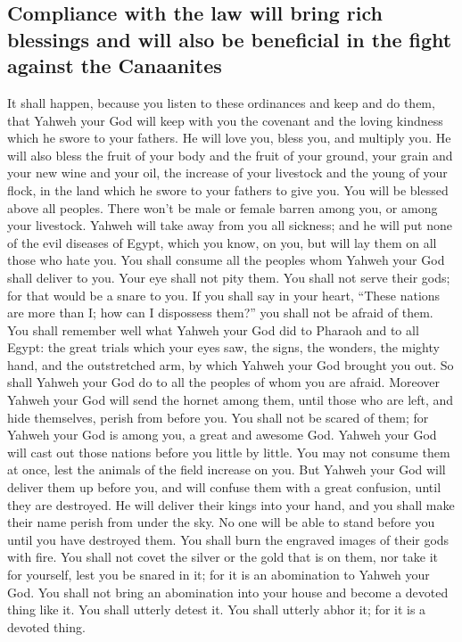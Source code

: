 \hypertarget{compliance-with-the-law-will-bring-rich-blessings-and-will-also-be-beneficial-in-the-fight-against-the-canaanites}{%
\subsection{Compliance with the law will bring rich blessings and will
also be beneficial in the fight against the
Canaanites}\label{compliance-with-the-law-will-bring-rich-blessings-and-will-also-be-beneficial-in-the-fight-against-the-canaanites}}

 It shall happen, because you listen to these ordinances
and keep and do them, that Yahweh your God will keep with you the
covenant and the loving kindness which he swore to your fathers.
 He will love you, bless you, and multiply you. He will
also bless the fruit of your body and the fruit of your ground, your
grain and your new wine and your oil, the increase of your livestock and
the young of your flock, in the land which he swore to your fathers to
give you.  You will be blessed above all peoples. There
won't be male or female barren among you, or among your livestock.
 Yahweh will take away from you all sickness; and he will
put none of the evil diseases of Egypt, which you know, on you, but will
lay them on all those who hate you.  You shall consume
all the peoples whom Yahweh your God shall deliver to you. Your eye
shall not pity them. You shall not serve their gods; for that would be a
snare to you.  If you shall say in your heart, ``These
nations are more than I; how can I dispossess them?'' 
you shall not be afraid of them. You shall remember well what Yahweh
your God did to Pharaoh and to all Egypt:  the great
trials which your eyes saw, the signs, the wonders, the mighty hand, and
the outstretched arm, by which Yahweh your God brought you out. So shall
Yahweh your God do to all the peoples of whom you are afraid.
 Moreover Yahweh your God will send the hornet among
them, until those who are left, and hide themselves, perish from before
you.  You shall not be scared of them; for Yahweh your
God is among you, a great and awesome God.  Yahweh your
God will cast out those nations before you little by little. You may not
consume them at once, lest the animals of the field increase on you.
 But Yahweh your God will deliver them up before you, and
will confuse them with a great confusion, until they are destroyed.
 He will deliver their kings into your hand, and you
shall make their name perish from under the sky. No one will be able to
stand before you until you have destroyed them.  You
shall burn the engraved images of their gods with fire. You shall not
covet the silver or the gold that is on them, nor take it for yourself,
lest you be snared in it; for it is an abomination to Yahweh your God.
 You shall not bring an abomination into your house and
become a devoted thing like it. You shall utterly detest it. You shall
utterly abhor it; for it is a devoted thing.

